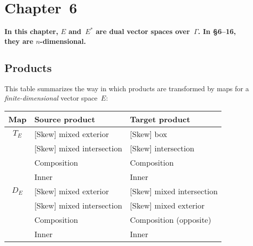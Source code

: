 \documentclass[letterpaper,12pt]{article}
\theoremstyle{definition}
\theoremstyle{remark}
\begin{document}
\newpage
\section*{Chapter~6}
{\boldmath\textbf{In this chapter, \(E\) and~\(E^*\) are dual vector spaces over~\(\Gamma\). In \S6--16, they are \(n\)-dimensional.}}

\subsection*{Products}
\noindent This table summarizes the way in which products are transformed by maps for a \emph{finite-dimensional} vector space~\(E\):
\begin{center}
\begin{tabular}{|c|l|l|}
\hline
\textbf{Map}&\textbf{Source product}&\textbf{Target product}\\
\hline
\(T_E\)&[Skew] mixed exterior&[Skew] box\\
	&[Skew] mixed intersection&[Skew] intersection\\
	&Composition&Composition\\
	&Inner&Inner\\
\hline
\(D_E\)&[Skew] mixed exterior&[Skew] mixed intersection\\
	&[Skew] mixed intersection&[Skew] mixed exterior\\
	&Composition&Composition (opposite)\\
	&Inner&Inner\\
\hline
\end{tabular}
\end{center}
\end{document}

